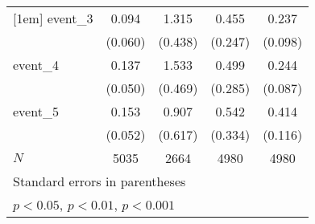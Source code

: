 {\begin{tabular}{l*{4}{c}}
[1em]
event\_3     &       0.094         &       1.315\sym{**} &       0.455         &       0.237\sym{*}  \\
            &     (0.060)         &     (0.438)         &     (0.247)         &     (0.098)         \\
[1em]
event\_4     &       0.137\sym{**} &       1.533\sym{**} &       0.499         &       0.244\sym{**} \\
            &     (0.050)         &     (0.469)         &     (0.285)         &     (0.087)         \\
[1em]
event\_5     &       0.153\sym{**} &       0.907         &       0.542         &       0.414\sym{***}\\
            &     (0.052)         &     (0.617)         &     (0.334)         &     (0.116)         \\
\hline
\(N\)       &        5035         &        2664         &        4980         &        4980         \\
\hline\hline
\multicolumn{5}{l}{\footnotesize Standard errors in parentheses}\\
\multicolumn{5}{l}{\footnotesize \sym{*} \(p<0.05\), \sym{**} \(p<0.01\), \sym{***} \(p<0.001\)}\\
\end{tabular}
}
